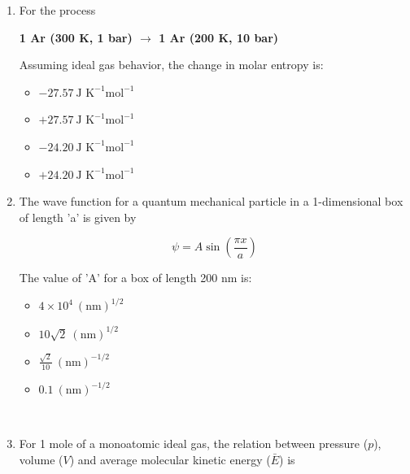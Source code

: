\documentclass[journal,12pt,onecolumn]{IEEEtran}
\theoremstyle{remark}
\begin{document}
\begin{enumerate}
 

\item    \hspace{0.5 cm} For the process  \hfill{}

\begin{center}
\textbf{1 Ar (300 K, 1 bar) $\rightarrow$ 1 Ar (200 K, 10 bar)}
\end{center}

Assuming ideal gas behavior, the change in molar entropy is:

\begin{multicols}{2}
\begin{itemize}[label=(A)]
    \item $-27.57 \ \text{J K}^{-1} \text{mol}^{-1}$
    \item $+27.57 \ \text{J K}^{-1} \text{mol}^{-1}$
    \item $-24.20 \ \text{J K}^{-1} \text{mol}^{-1}$
    \item $+24.20 \ \text{J K}^{-1} \text{mol}^{-1}$
\end{itemize}
\end{multicols}

 

\item    \hspace{0.5 cm} The wave function for a quantum mechanical particle in a 1-dimensional box of length 'a' is given by  \hfill{}

\[
\psi = A \sin\left(\frac{\pi x}{a}\right)
\]

The value of 'A' for a box of length 200 nm is:

\begin{multicols}{2}
\begin{itemize}[label=(A)]
    \item $4 \times 10^4 \ (\text{nm})^{1/2}$
    \item $10\sqrt{2} \ (\text{nm})^{1/2}$
    \item $\frac{\sqrt{2}}{10} \ (\text{nm})^{-1/2}$
    \item $0.1 \ (\text{nm})^{-1/2}$
\end{itemize}
\end{multicols}

\newpage
\

\item    \hspace{0.5cm} For 1 mole of a monoatomic ideal gas, the relation between pressure (\(p\)), volume (\(V\)) and average molecular kinetic energy (\(\bar{E}\)) is  \hfill{}


\end{enumerate}
\end{document}
